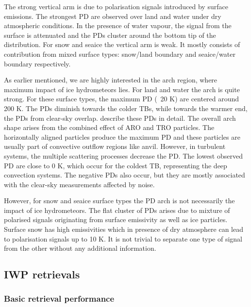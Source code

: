 \documentclass[amt, manuscript]{copernicus}
\begin{document}
The strong vertical arm is due to polarisation signals introduced by surface emissions. The strongest PD are observed over land and water under dry atmospheric conditions. In the presence of water vapour, the signal from the surface is attenuated and the PDs cluster around the bottom tip of the distribution. For snow and seaice the vertical arm is weak. It mostly consists of contribution from mixed surface types: snow/land boundary and seaice/water boundary respectively. 

As earlier mentioned, we are highly interested in the arch region, where maximum impact of ice hydrometeors lies. For land and water the arch is quite strong. For these surface types, the maximum PD (~20\,\,K) are centered around 200\,\,K. The PDs diminish towards the colder TBs, while towards the warmer end, the PDs from clear-sky overlap. \citet{gong:micro:17} describe these PDs in detail. The overall arch shape arises from the combined effect of ARO and TRO particles. The horizontally aligned particles produce the maximum PD and these particles are usually part of convective outflow regions like anvil. However, in turbulent systems, the multiple scattering processes decrease the PD. The lowest observed PD are close to 0\,\,K, which occur for the coldest TB, representing the deep convection systems. The negative PDs also occur, but they are mostly associated with the clear-sky measurements affected by noise. 

However, for snow and seaice surface types the PD arch is not necessarily  the impact of ice hydrometeors. The flat cluster of PDs arises due to mixture of polarised signals originating from surface emissivity as well as ice particles. Surface snow has high emissivities which in presence of dry atmosphere can lead to polarisation signals up to 10\,\,K. It is not trivial to separate one type of signal from the other without any additional information.


\subsection{IWP retrievals}
%
\label{sec:iwp_retrievals}
\subsubsection{Basic retrieval performance}
%
\label{sec:basic_performance}
\end{document}
